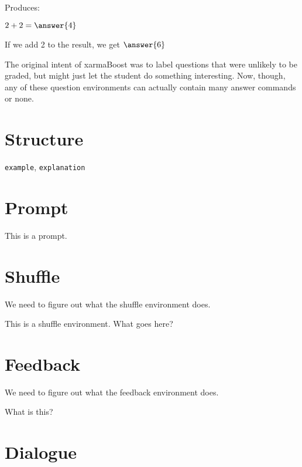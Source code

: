 \documentclass{ximera}
\begin{document}
Produces:

\begin{question}
  $2+2 = \answer{4}$
  \begin{problem}
  If we add 2 to the result, we get $\answer{6}$
  \end{problem}
\end{question}

\begin{remark} 
The original intent of xarmaBoost was to label questions that were unlikely to be graded, but might just let the student do something interesting. Now, though, any of these question environments can actually contain many answer commands or none.
\end{remark}

\section{Structure}



\verb!example!, \verb!explanation!



\section{Prompt}

\begin{prompt}
This is a prompt.
\end{prompt}



\section{Shuffle}

We need to figure out what the shuffle environment does.

\begin{shuffle}
This is a shuffle environment. What goes here?
\end{shuffle}


\section{Feedback}

We need to figure out what the feedback environment does.

\begin{feedback}
What is this?
\end{feedback}

\section{Dialogue}
\end{document}
